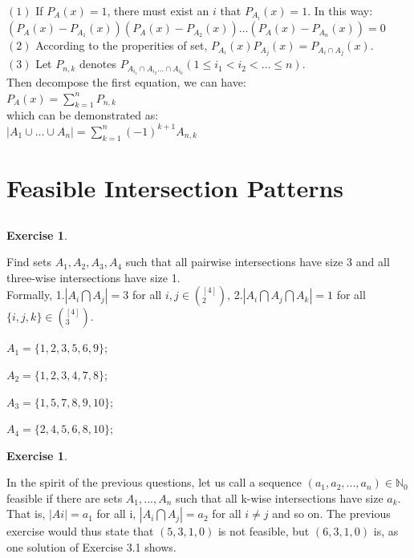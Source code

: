 \documentclass[12pt,a4]{article}
\theoremstyle{exercise}
\newtheorem{exercise}[theorem]{Exercise}
\begin{document}
\begin{enumerate}
    $(1)$ If $P_A(x) = 1$, there must exist an $i$ that $P_{A_i}(x) = 1$. In this way:\\
    $(P_A(x) - P_{A_1}(x))(P_A(x) - P_{A_2}(x))\ldots(P_A(x) - P_{A_n}(x)) = 0$\\

    $(2)$ According to the properities of set, $P_{A_i}(x)P_{A_j}(x) = P_{A_i \cap A_j}(x)$.\\

    $(3)$ Let $P_{n,k}$ denotes $P_{A_{i_1}\cap A_{i_2}\ldots\cap A_{i_k}}(1\le i_1<i_2<\ldots\le n)$.\\
    Then decompose the first equation, we can have:\\
    $P_A(x) = \sum\limits_{k=1}^{n}P_{n,k}$\\
    which can be demonstrated as:\\
     $\left\vert{A_1\cup\ldots\cup A_n}\right\vert = \sum\limits_{k=1}^{n}(-1)^{k+1}A_{n,k}$\\
\end{enumerate}

\section{Feasible Intersection Patterns}

\subsection{}

\begin{exercise}
\end{exercise}
  Find sets $A_1, A_2, A_3, A_4$ such that all pairwise intersections have size 3 and all three-wise intersections have size 1. \\Formally,
 1.$|A_i\bigcap A_j| = 3$ for all ${i,j} \in (^{[4]}_{2})$,
 2.$|A_i\bigcap A_j\bigcap A_k| = 1$ for all $\{i,j,k\}\in (^{[4]}_{3})$.

    
    
    $A_1=\{1,2,3,5,6,9\}$;
    
    $A_2=\{1,2,3,4,7,8\}$;
    
    $A_3=\{1,5,7,8,9,10\}$;
    
    $A_4=\{2,4,5,6,8,10\}$;
    
\begin{exercise}
\end{exercise}
	In the spirit of the previous questions, let us call a sequence $(a_1,a_2,...,a_n)\in\mathbb{N}_0$ feasible if there are sets $A_1,...,A_n$ such that all k-wise intersections have size $a_k$. That is, $|Ai| = a_{1}$ for all i, $|A_i \bigcap A_j| = a_2$ for all $i \not= j$ and so on. The previous exercise would thus state that $(5, 3, 1, 0)$ is not feasible, but $(6, 3, 1, 0)$ is, as one solution of Exercise 3.1 shows.
\end{document}
